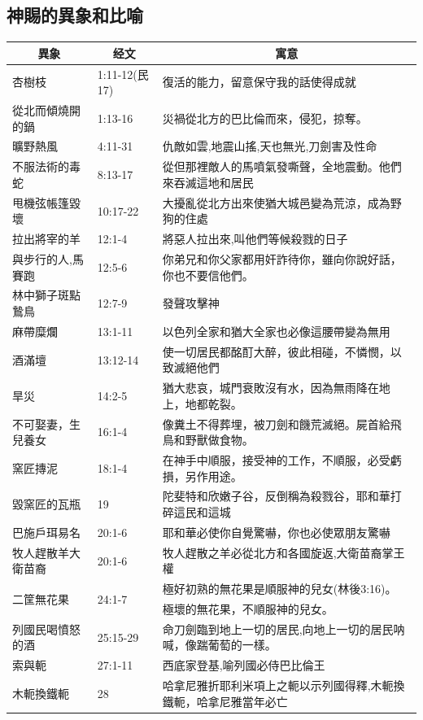 \subsection{神賜的異象和比喻}
\begin{table}[H]
\centering
\begin{tabular}{p{3.5cm}|p{2.50cm}|p{11.0cm}}\hline\hline
\multicolumn{1}{c|}{異象}&\multicolumn{1}{c|}{经文}&\multicolumn{1}{c}{寓意}\\\hline
杏樹枝& 1:11-12(民17)&復活的能力，留意保守我的話使得成就\\\hline 
從北而傾燒開的鍋&1:13-16&災禍從北方的巴比倫而來，侵犯，掠奪。\\\hline
曠野熱風&4:11-31&仇敵如雲,地震山搖,天也無光,刀劍害及性命\\\hline
不服法術的毒蛇&8:13-17&從但那裡敵人的馬噴氣發嘶聲，全地震動。他們來吞滅這地和居民\\\hline
甩機弦帳篷毀壞&10:17-22&大擾亂從北方出來使猶大城邑變為荒涼，成為野狗的住處\\\hline
拉出將宰的羊&12:1-4&將惡人拉出來,叫他們等候殺戮的日子\\\hline
與步行的人,馬賽跑&12:5-6&你弟兄和你父家都用奸詐待你，雖向你說好話，你也不要信他們。\\\hline
林中獅子斑點鷙鳥&12:7-9&發聲攻擊神\\\hline
麻帶糜爛&13:1-11&以色列全家和猶大全家也必像這腰帶變為無用\\\hline
酒滿壇&13:12-14&使一切居民都酩酊大醉，彼此相碰，不憐憫，以致滅絕他們\\\hline
旱災&14:2-5&猶大悲哀，城門衰敗沒有水，因為無雨降在地上，地都乾裂。\\\hline
不可娶妻，生兒養女&16:1-4&像糞土不得葬埋，被刀劍和饑荒滅絕。屍首給飛鳥和野獸做食物。\\\hline
窯匠摶泥&18:1-4&在神手中順服，接受神的工作，不順服，必受虧損，另作用途。\\\hline 
毀窯匠的瓦瓶&19&陀斐特和欣嫩子谷，反倒稱為殺戮谷，耶和華打碎這民和這城\\\hline 
巴施戶珥易名&20:1-6&耶和華必使你自覺驚嚇，你也必使眾朋友驚嚇\\\hline
牧人趕散羊大衛苗裔&20:1-6&牧人趕散之羊必從北方和各國旋返,大衛苗裔掌王權\\\hline
\multirow{2}{5.8cm}{二筐無花果}&\multirow{2}{2.8cm}{24:1-7}&極好初熟的無花果是順服神的兒女(林後3:16)。\\\cline{3-3}
&&極壞的無花果，不順服神的兒女。\\\hline
列國民喝憤怒的酒&25:15-29&命刀劍臨到地上一切的居民,向地上一切的居民呐喊，像踹葡萄的一樣。\\\hline
索與軛&27:1-11&西底家登基,喻列國必侍巴比倫王\\\hline
木軛換鐵軛&28&哈拿尼雅折耶利米項上之軛以示列國得釋,木軛換鐵軛，哈拿尼雅當年必亡\\\hline


\end{tabular}
\end{table}
